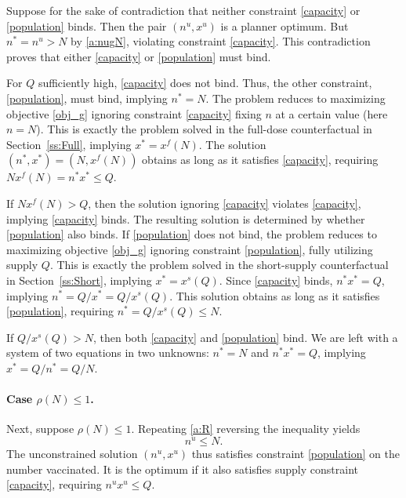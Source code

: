\documentclass[12pt]{article}
\newcommand{\ratio}{\rho(N)}
\newcommand{\xfull}{x^{f\!}}
\newcommand{\xshort}{x^{s}}
\newcommand{\xun}{x^{u}}
\newcommand{\nun}{n^{u}}
\begin{document}
Suppose for the sake of contradiction that neither constraint
\eqref{capacity} or \eqref{population} binds. Then the pair $(\nun,
\xun)$ is a planner optimum. But $n^* = n^u > N$ by \eqref{a:nugN},
violating constraint \eqref{capacity}. This contradiction proves that
either \eqref{capacity} or \eqref{population} must bind.

For $Q$ sufficiently high, \eqref{capacity} does not bind. Thus, the
other constraint, \eqref{population}, must bind, implying $n^* =
N$. The problem reduces to maximizing objective \eqref{obj_g} ignoring
constraint \eqref{capacity} fixing $n$ at a certain value (here $n =
N$). This is exactly the problem solved in the full-dose
counterfactual in Section~\ref{ss:Full}, implying $x^* =
\xfull(N)$. The solution $(n^*, x^*) = (N, \xfull(N))$ obtains as long
as it satisfies \eqref{capacity}, requiring $N \xfull(N) = n^* x^*
\leq Q$.

If $N \xfull(N) > Q$, then the solution ignoring \eqref{capacity}
violates \eqref{capacity}, implying \eqref{capacity} binds. The
resulting solution is determined by whether \eqref{population} also
binds. If \eqref{population} does not bind, the problem reduces to
maximizing objective \eqref{obj_g} ignoring constraint
\eqref{population}, fully utilizing supply $Q$. This is exactly the
problem solved in the short-supply counterfactual in
Section~\ref{ss:Short}, implying $x^* = \xshort(Q)$. Since
\eqref{capacity} binds, $n^* x^* = Q$, implying $n^* = Q / x^* = Q /
\xshort(Q)$. This solution obtains as long as it satisfies
\eqref{population}, requiring $n^* = Q / \xshort(Q) \leq N$.

If $Q / \xshort(Q) > N$, then both \eqref{capacity} and
\eqref{population} bind. We are left with a system of two equations in
two unknowns: $n^* = N$ and $n^* x^* = Q$, implying $x^* = Q / n^* =
Q/N$.

\paragraph{Case $\ratio \leq 1$.}

Next, suppose $\ratio \leq 1$. Repeating \eqref{a:R} reversing the inequality yields
\begin{equation}
\label{a:nulN}
n^u \leq N.
\end{equation} 
The unconstrained solution $(\nun, \xun)$ thus satisfies constraint \eqref{population} on the number vaccinated. It is the optimum if it also satisfies supply constraint \eqref{capacity}, requiring $\nun \xun \leq Q$. 
\end{document}
